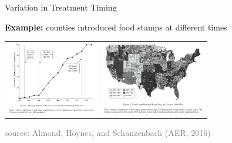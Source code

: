 \documentclass[10pt,xcolor=table,ignorenonframetext,handout,aspectratio=169]{beamer}
\begin{document}

\newpage
\begin{frame}{Variation in Treatment Timing}

\medskip

\textbf{Example:}  counties introduced food stamps at different times

\medskip
\medskip

\begin{center}

\begin{tabular}{cc}
	\includegraphics[height=3.2cm]{img/AlmondEtAl-graph.png}
	& 
	\includegraphics[height=3.2cm]{img/AlmondEtAl-map.png} \\
\end{tabular}

\smallskip

\tiny{\textcolor{gray}{source:  Almond, Hoynes, and Schanzenbach (AER, 2016)}}
\end{center}



\end{frame}


\end{document}
